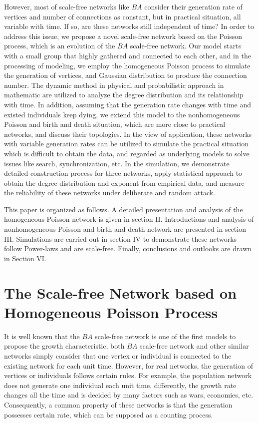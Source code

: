\documentclass[final]{IEEEtran}
\begin{document}
However, most of scale-free networks like $BA$ consider their
generation rate of vertices and number of connections as constant,
but in practical situation, all variable with time. If so, are
these networks still independent of time? In order to address this
issue, we propose a novel scale-free network based on the Poisson
process, which is an evolution of the $BA$ scale-free network. Our
model starts with a small group that highly gathered and connected
to each other, and in the processing of modeling, we employ the
homogeneous Poisson process to simulate the generation of
vertices, and Gaussian distribution to produce the connection
number. The dynamic method in physical and probabilistic approach
in mathematic are utilized to analyze the degree distribution and
its relationship with time. In addition, assuming that the
generation rate changes with time and existed individuals keep
dying, we extend this model to the nonhomogeneous Poisson and
birth and death situation, which are more close to practical
networks, and discuss their topologies. In the view of
application, these networks with variable generation rates can be
utilized to simulate the practical situation which is difficult to
obtain the data, and regarded as underlying models to solve issues
like search, synchronization, etc. In the simulation, we
demonstrate detailed construction process for three networks,
apply statistical approach to obtain the degree distribution and
exponent from empirical data, and measure the reliability of these
networks under deliberate and random attack.






This paper is organized as follows. A detailed presentation and
analysis of the homogeneous Poisson network is given in section
II. Introductions and analysis of nonhomogeneous Poisson and birth
and death network are presented in section III. Simulations are
carried out in section IV to demonstrate these networks follow
Power-laws and are scale-free. Finally, conclusions and outlooks
are drawn in Section VI.









\section{The Scale-free Network based on Homogeneous Poisson Process}

It is well known that the $BA$ scale-free network is one of the
first models to propose the growth characteristic, both $BA$
scale-free network and other similar networks simply consider that
one vertex or individual is connected to the existing network for
each unit time. However, for real networks, the generation of
vertices or individuals follows certain rules. For example, the
population network does not generate one individual each unit
time, differently, the growth rate changes all the time and is
decided by many factors such as wars, economies, etc.
Consequently, a common property of these networks is that the
generation possesses certain rate, which can be supposed as a
counting process.
\end{document}
